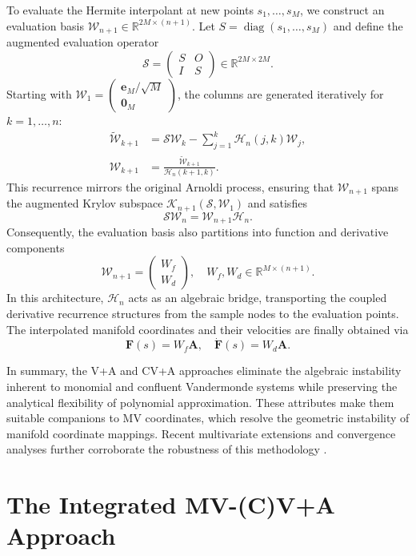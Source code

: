 \documentclass[11pt]{article}
\begin{document}
To evaluate the Hermite interpolant at new points $s_1, \ldots, s_M$, we construct an evaluation basis $\mathcal{W}_{n+1} \in \mathbb{R}^{2M \times (n+1)}$. Let $S = \operatorname{diag}(s_1,\ldots,s_M)$ and define the augmented evaluation operator
 $$
\mathcal{S} = \begin{pmatrix} S & O \\ I & S \end{pmatrix} \in \mathbb{R}^{2M \times 2M}.
 $$
Starting with $\mathcal{W}_1 = \begin{pmatrix} \mathbf{e}_M/\sqrt{M} \\ \mathbf{0}_M \end{pmatrix}$, the columns are generated iteratively for $k = 1, \ldots, n$:
\begin{align*}
\tilde{\mathcal{W}}_{k+1} &= \mathcal{S} \mathcal{W}_k - \sum_{j=1}^k \mathcal{H}_n(j,k) \mathcal{W}_j, \\
\mathcal{W}_{k+1} &= \frac{\tilde{\mathcal{W}}_{k+1}}{\mathcal{H}_n(k+1,k)}.
\end{align*}
This recurrence mirrors the original Arnoldi process, ensuring that $\mathcal{W}_{n+1}$ spans the augmented Krylov subspace $\mathcal{K}_{n+1}(\mathcal{S}, \mathcal{W}_1)$ and satisfies
 $$
\mathcal{S} \mathcal{W}_n = \mathcal{W}_{n+1} \mathcal{H}_n.  $$
Consequently, the evaluation basis also partitions into function and derivative components
 $$
\mathcal{W}_{n+1} = \begin{pmatrix} W_f \\ W_d \end{pmatrix}, \quad W_f, W_d \in \mathbb{R}^{M \times (n+1)}.  $$
In this architecture, $\mathcal{H}_n$ acts as an algebraic bridge, transporting the coupled derivative recurrence structures from the sample nodes to the evaluation points. The interpolated manifold coordinates and their velocities are finally obtained via
 $$
\mathbf{F}(s) = W_f \mathbf{A}, \quad \dot{\mathbf{F}}(s) = W_d \mathbf{A}.  $$

In summary, the V+A and CV+A approaches  eliminate the algebraic instability inherent to monomial and confluent Vandermonde systems while preserving the analytical flexibility of polynomial approximation. These attributes make them suitable companions to MV coordinates, which resolve the geometric instability of manifold coordinate mappings. Recent multivariate extensions and convergence analyses further corroborate the robustness of this methodology \cite{zhang2025multivariate, zhu2025convergence}.
 

\section{The Integrated MV-(C)V+A Approach}
\label{sec4}
\end{document}
